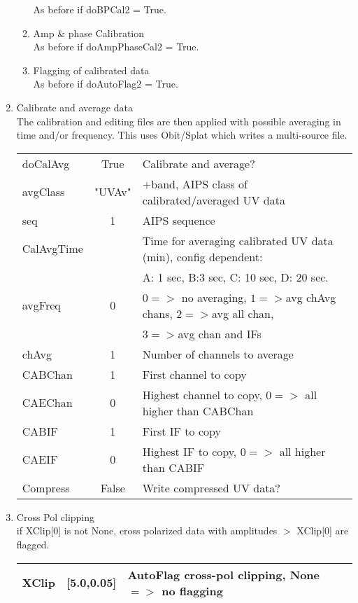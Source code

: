 \documentclass[11pt]{article}
\begin{document}
\begin{enumerate}
\begin{enumerate}
As before if doBPCal2 = True.
\item Amp \& phase Calibration \\
As before if doAmpPhaseCal2 = True.
\item Flagging of calibrated data\\
As before if doAutoFlag2 = True.
\end{enumerate}
\item Calibrate and average data\\
The calibration and editing files are then applied with possible
averaging in time and/or frequency.
This uses Obit/Splat which writes a multi-source file.
\begin{center}
\begin{tabular}{|l|c|l|}
\hline
doCalAvg  & True &  Calibrate and average?\\
avgClass  & "UVAv" & +band, AIPS class of calibrated/averaged UV data \\
seq  & 1 &  AIPS sequence \\
CalAvgTime  &  &  Time for averaging calibrated UV data (min), config
dependent: \\
 & & A: 1 sec, B:3 sec, C: 10 sec, D: 20 sec. \\
avgFreq  & 0 &  $0=>$ no averaging, $1=>$avg chAvg chans, $2=>$avg all
chan, \\
 & &$3=>$avg chan and IFs\\
chAvg  & 1 & Number of channels to average \\
CABChan& 1 &  First channel to copy \\
CAEChan& 0 &  Highest channel to copy, $0=>$ all higher than CABChan\\
CABIF  & 1 &  First IF to copy \\
CAEIF  & 0 &  Highest IF to copy, $0=>$ all higher than CABIF\\
Compress & False &  Write compressed UV data?\\
\hline
\end{tabular}
\end{center}
%
\item Cross Pol clipping\\
if XClip[0] is not None,  cross polarized data with amplitudes $>$ XClip[0] are flagged.
\begin{center}
\begin{tabular}{|l|c|l|}
\hline
XClip  & [5.0,0.05] & AutoFlag cross-pol clipping, None$=>$ no flagging \\
\hline
\end{tabular}

\end{center}
\end{enumerate}
\end{document}
